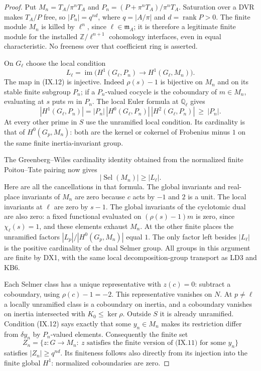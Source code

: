 \begin{proof}
Put $M_n=T_A/\pi^nT_A$ and
$P_n=(P+\pi^nT_A)/\pi^nT_A$.  Saturation over a DVR makes
$T_A/P$ free, so
$|P_n|=q^{n d}$, where $q=|A/\pi|$ and $d=\operatorname{rank}P>0$.
The finite module $M_n$ is killed by $\ell^n$, since
$\ell\in\mathfrak m_A$; it is therefore a legitimate
finite module for the installed $\mathbb Z/\ell^{n+1}$
cohomology interfaces, even in equal characteristic.
No freeness over that coefficient ring is asserted.

On $G_\ell$ choose the local condition
\[
 L_\ell=\operatorname{im}
                  \bigl(H^1(G_\ell,P_n)\to H^1(G_\ell,M_n)\bigr).
 \tag{IX.12}
\]
The map in (IX.12) is injective.  Indeed $\rho(s)-1$
is bijective on $M_n$ and on its stable finite subgroup
$P_n$; if a $P_n$-valued cocycle is the coboundary of
$m\in M_n$, evaluating at $s$ puts $m$ in $P_n$.
The local Euler formula at $\mathbb Q_\ell$ gives
\[
 |H^1(G_\ell,P_n)|
       =|P_n|\,|H^0(G_\ell,P_n)|\,|H^2(G_\ell,P_n)|
       \ \ge\ |P_n|.
 \tag{IX.13}
\]
At every other prime in $S$ use the unramified local
condition.  Its cardinality is that of $H^0(G_p,M_n)$:
both are the kernel or cokernel of Frobenius minus $1$
on the same finite inertia-invariant group.

The Greenberg--Wiles cardinality identity obtained from
the normalized finite Poitou--Tate pairing now gives
\[
                         |\operatorname{Sel}(M_n)|\ge |L_\ell|.
 \tag{IX.14}
\]
Here are all the cancellations in that formula.
The global invariants and real-place invariants of $M_n$
are zero because $c$ acts by $-1$ and $2$ is a unit.
The local invariants at $\ell$ are zero by $s-1$.
The global invariants of the cyclotomic dual are also
zero: a fixed functional evaluated on
$(\rho(s)-1)m$ is zero, since $\chi_\ell(s)=1$,
and these elements exhaust $M_n$.
At the other finite places the unramified factors
$|L_p|/|H^0(G_p,M_n)|$ equal $1$.
The only factor left besides $|L_\ell|$ is the positive
cardinality of the dual Selmer group.  All groups in
this argument are finite by DX1, with the same local
decomposition-group transport as LD3 and KB6.

Each Selmer class has a unique representative with
$z(c)=0$: subtract a coboundary, using
$\rho(c)-1=-2$.  This representative vanishes on $N$.
At $p\ne\ell$ a locally unramified class is a
coboundary on inertia, and a coboundary vanishes on
inertia intersected with $K_0\le\ker\rho$.
Outside $S$ it is already unramified.
Condition (IX.12) says exactly that some $y_n\in M_n$
makes its restriction differ from $\delta y_n$ by
$P_n$-valued elements.  Consequently the finite set
\[
 Z_n=\{z:G\to M_n:\ z\text{ satisfies the finite version of
                                      (IX.11) for some }y_n\}
 \tag{IX.15}
\]
satisfies $|Z_n|\ge q^{nd}$.  Its finiteness follows
also directly from its injection into the finite global
$H^1$: normalized coboundaries are zero.


\end{proof}
